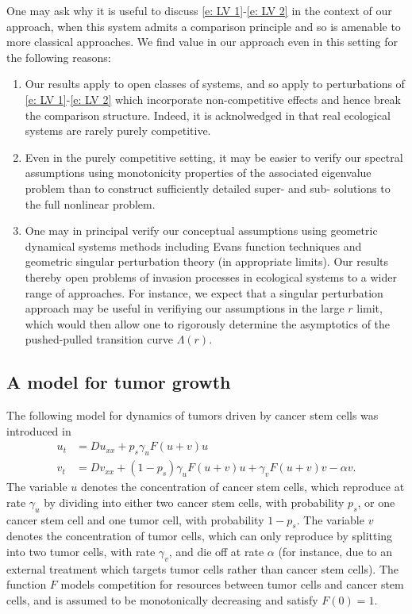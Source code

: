 \documentclass[11pt]{article}
\numberwithin{equation}{section}
\numberwithin{prop}{section}
\begin{document}
One may ask why it is useful to discuss \eqref{e: LV 1}-\eqref{e: LV 2} in the context of our approach, when this system admits a comparison principle and so is amenable to more classical approaches. We find value in our approach even in this setting for the following reasons:
\begin{enumerate}
	\item Our results apply to open classes of systems, and so apply to perturbations of \eqref{e: LV 1}-\eqref{e: LV 2} which incorporate non-competitive effects and hence break the comparison structure. Indeed, it is acknolwedged in \cite{LLWCooperative} that real ecological systems are rarely purely competitive. 
	\item Even in the purely competitive setting, it may be easier to verify our spectral assumptions using monotonicity properties of the associated eigenvalue problem than to construct sufficiently detailed super- and sub- solutions to the full nonlinear problem. 
	\item One may in principal verify our conceptual assumptions using geometric dynamical systems methods including Evans function techniques and geometric singular perturbation theory (in appropriate limits). Our results thereby open problems of invasion processes in ecological systems to a wider range of approaches. For instance, we expect that a singular perturbation approach may be useful in verifiying our assumptions in the large $r$ limit, which would then allow one to rigorously determine the asymptotics of the pushed-pulled transition curve $\Lambda(r)$. 
\end{enumerate}

\subsection{A model for tumor growth}

The following model for dynamics of tumors driven by cancer stem cells was introduced in \cite{Tumor1}
\begin{align}
	u_t &= D u_{xx} + p_s \gamma_u F(u+v) u \label{e: tumor 0 1} \\
	v_t &= D v_{xx} + (1-p_s) \gamma_u F(u+v) u + \gamma_v F(u+v) v - \alpha v. \label{e: tumor 0 2}
\end{align}
The variable $u$ denotes the concentration of cancer stem cells, which reproduce at rate $\gamma_u$ by dividing into either two cancer stem cells, with probability $p_s$, or one cancer stem cell and one tumor cell, with probability $1-p_s$. The variable $v$ denotes the concentration of tumor cells, which can only reproduce by splitting into two tumor cells, with rate $\gamma_v$, and die off at rate $\alpha$ (for instance, due to an external treatment which targets tumor cells rather than cancer stem cells). The function $F$ models competition for resources between tumor cells and cancer stem cells, and is assumed to be monotonically decreasing and satisfy $F(0) = 1$. 
\end{document}
